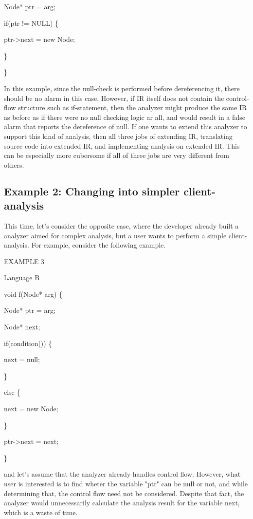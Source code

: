   \quad Node* ptr = arg;
  
  \quad if(ptr != NULL) \{

    \quad \quad ptr->next = new Node;

  \quad \}

\}

In this example, since the null-check is performed before dereferencing it,
there should be no alarm in this case. However, if IR itself does not contain
the control-flow structure such as if-statement, then the analyzer might
produce the same IR as before as if there were no null checking logic ar all,
and would result in a false alarm that reports the dereference of null. If one
wants to extend this analyzer to support this kind of analysis, then all
three jobs of extending IR, translating source code into extended IR, and
implementing analysis on extended IR. This can be especially more cubersome
if all of three jobs are very different from others.

\subsection{Example 2: Changing into simpler client-analysis}

This time, let's consider the opposite case, where the developer already built
a analyzer aimed for complex analysis, but a user wants to perform a 
simple client-analysis. For example, consider the following example.

EXAMPLE 3

Language B

void f(Node* arg) \{

  \quad Node* ptr = arg;

  \quad Node* next;

  \quad if(condition()) \{

    \quad \quad next = null;
  
  \quad \}

  \quad else \{
   
    \quad \quad next = new Node;
  
  \quad \}

  \quad ptr->next = next;

\}

and let's assume that the analyzer already handles control flow.
However, what user is interested is to find wheter the variable "ptr"
can be null or not, and while determining that, the control flow need
not be considered. Despite that fact, the analyzer would unnecessarily
calculate the analysis result for the variable next, which is a waste
of time.

